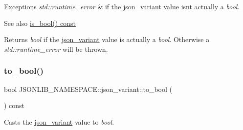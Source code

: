 \begin{DoxyExceptions}{Exceptions}
{\em std\+::runtime\+\_\+error} & if the \hyperlink{classJSONLIB__NAMESPACE_1_1json__variant}{json\+\_\+variant} value isn\textquotesingle{}t actually a {\itshape bool}. \\
\hline
\end{DoxyExceptions}
\begin{DoxySeeAlso}{See also}
\hyperlink{classJSONLIB__NAMESPACE_1_1json__variant_a99bd3f5d21800b7b1cc7af956c17d534}{is\+\_\+bool() const} 
\end{DoxySeeAlso}
\begin{DoxyReturn}{Returns}
{\itshape bool} if the \hyperlink{classJSONLIB__NAMESPACE_1_1json__variant}{json\+\_\+variant} value is actually a {\itshape bool}. Otherwise a {\itshape std\+::runtime\+\_\+error} will be thrown. 
\end{DoxyReturn}
\mbox{\label{classJSONLIB__NAMESPACE_1_1json__variant_a7a675f60b84c0f8e6ee30aba7cb0b72c}} 
\subsubsection{\texorpdfstring{to\+\_\+bool()}{to\_bool()}\hspace{0.1cm}{\footnotesize\ttfamily [2/2]}}
{\footnotesize\ttfamily bool J\+S\+O\+N\+L\+I\+B\+\_\+\+N\+A\+M\+E\+S\+P\+A\+C\+E\+::json\+\_\+variant\+::to\+\_\+bool (\begin{DoxyParamCaption}{ }\end{DoxyParamCaption}) const}



Casts the \hyperlink{classJSONLIB__NAMESPACE_1_1json__variant}{json\+\_\+variant} value to {\itshape bool}. 


